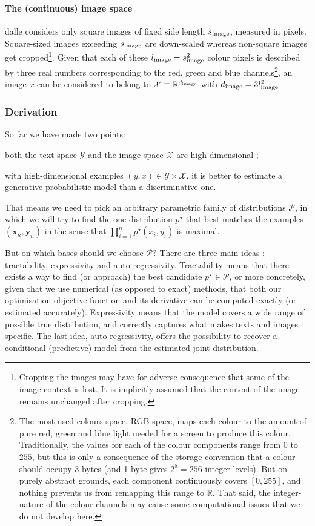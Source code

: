 \documentclass{article}
\begin{document}
\begin{multicols}{2}
\paragraph{The (continuous) image space}

\gls{dalle} considers only square images of fixed side length $s_{\mathrm{image}}$, measured in pixels.
Square-sized images exceeding $s_{\mathrm{image}}$ are down-scaled whereas non-square images get cropped\footnote{
Cropping the images may have for adverse consequence that some of the image context is lost. It is implicitly assumed that the content of the image remains unchanged after cropping.
}.
Given that each of these $l_{\mathrm{image}}=s_{\mathrm{image}}^2$ colour pixels is described by three real numbers corresponding to the red, green and blue channels\footnote{
The most used colours-space, RGB-space, maps each colour to the amount of pure red, green and blue light needed for a screen to produce this colour. Traditionally, the values for each of the colour components range from 0 to $255$, but this is only a consequence of the storage convention that a colour should occupy 3 bytes (and 1 byte gives $2^8=256$ integer levels). But on purely abstract grounds, each component continuously covers $[0,255]$, and nothing prevents us from remapping this range to $\mathbb{R}$.
That said, the integer-nature of the colour channels may cause some computational issues that we do not develop here.
}, an image $x$ can be considered to belong to $\mathcal{X}\equiv \mathbb{R}^{d_{\mathrm{image}}}$ with $d_{\mathrm{image}}=3l_{\mathrm{image}}^2$.

\subsubsection{Derivation}

So far we have made two points: \begin{enumerate*}[label=(\roman*)]
\item both the text space $\mathcal{Y}$ and the image space $\mathcal{X}$ are high-dimensional ;
\item with high-dimensional examples $(y,x)\in\mathcal{Y}\times\mathcal{X}$, it is better to estimate a generative probabilistic model than a discriminative one.
\end{enumerate*}
That means we need to pick an arbitrary parametric family of distributions $\mathcal{P}$, in which we will try to find the one distribution $p^\star$ that best matches the examples $(\mathbf{x}_n,\mathbf{y}_n)$ in the sense that $\prod_{i=1}^{n} p^\star(x_i,y_i)$ is maximal.

But on which bases should we choose $\mathcal{P}$? There are three main ideas : tractability, expressivity and auto-regressivity. Tractability means that there exists a way to find (or approach) the best candidate $p^\star \in \mathcal{P}$, or more concretely, given that we use numerical (as opposed to exact) methods, that both our optimisation objective function and its derivative can be computed exactly (or estimated accurately). Expressivity means that the model covers a wide range of possible true distribution, and correctly captures what makes texts and images specific. The last idea, auto-regressivity, offers the possibility to recover a conditional (predictive) model from the estimated joint distribution.


\end{multicols}
\end{document}
